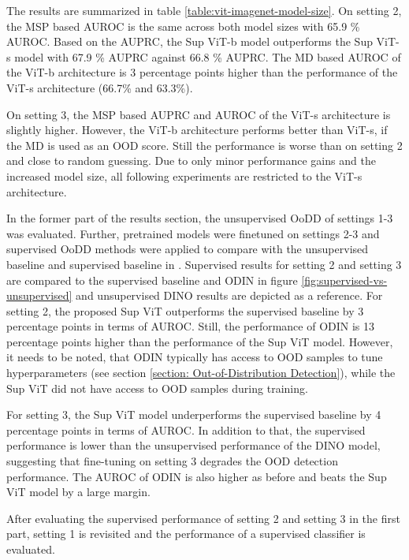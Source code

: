The results are summarized in table \ref{table:vit-imagenet-model-size}.
On setting 2, the MSP based AUROC is the same across both model sizes with 65.9 \% AUROC.
Based on the AUPRC, the Sup ViT-b model outperforms the Sup ViT-s model with 67.9 \% AUPRC against 66.8 \% AUPRC.
The MD based AUROC of the ViT-b architecture is 3 percentage points higher than the performance of the ViT-s architecture (66.7\% and 63.3\%).
\par
On setting 3, the MSP based AUPRC and AUROC of the ViT-s architecture is slightly higher.
However, the ViT-b architecture performs better than ViT-s, if the MD is used as an OOD score.
Still the performance is worse than on setting 2 and close to random guessing.
Due to only minor performance gains and the increased model size, all following experiments are restricted to the ViT-s architecture.
\par
In the former part of the results section, the unsupervised OoDD of settings 1-3 was evaluated.
Further, pretrained models were finetuned on settings 2-3 and supervised OoDD methods were applied to compare with the unsupervised baseline and supervised baseline in \citep{Berger2021}.
Supervised results for setting 2 and setting 3 are compared to the supervised baseline and ODIN in figure \ref{fig:supervised-vs-unsupervised} and unsupervised DINO results are depicted as a reference.
For setting 2, the proposed Sup ViT outperforms the supervised baseline by 3 percentage points in terms of AUROC.
Still, the performance of ODIN is 13 percentage points higher than the performance of the Sup ViT model.
However, it needs to be noted, that ODIN typically has access to OOD samples to tune hyperparameters (see section \ref{section: Out-of-Distribution Detection}), while the Sup ViT did not have access to OOD samples during training.
\par
For setting 3, the Sup ViT model underperforms the supervised baseline by 4 percentage points in terms of AUROC.
In addition to that, the supervised performance is lower than the unsupervised performance of the DINO model, suggesting that fine-tuning on setting 3 degrades the OOD detection performance.
The AUROC of ODIN is also higher as before and beats the Sup ViT model by a large margin.
\par
After evaluating the supervised performance of setting 2 and setting 3 in the first part, setting 1 is revisited and the performance of a supervised classifier is evaluated.
